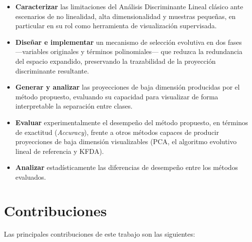 	\begin{itemize}
		\item \textbf{Caracterizar} las limitaciones del Análisis Discriminante Lineal clásico ante escenarios de no linealidad, alta dimensionalidad y muestras pequeñas, en particular en su rol como herramienta de visualización supervisada.
		
		\item \textbf{Diseñar e implementar} un mecanismo de selección evolutiva en dos fases —variables originales y términos polinomiales— que reduzca la redundancia del espacio expandido, preservando la trazabilidad de la proyección discriminante resultante.
		
		\item \textbf{Generar y analizar} las proyecciones de baja dimensión producidas por el método propuesto, evaluando su capacidad para visualizar de forma interpretable la separación entre clases.
		
		\item \textbf{Evaluar} experimentalmente el desempeño del método propuesto, en términos de exactitud (\textit{Accuracy}), frente a otros métodos capaces de producir proyecciones de baja dimensión visualizables (PCA, el algoritmo evolutivo lineal de referencia y KFDA).
		
		\item \textbf{Analizar} estadísticamente las diferencias de desempeño entre los métodos evaluados.
		
	\end{itemize}
	
	\section{Contribuciones}
	\label{sec:Contribuciones}
	
	Las principales contribuciones de este trabajo son las siguientes:
	
